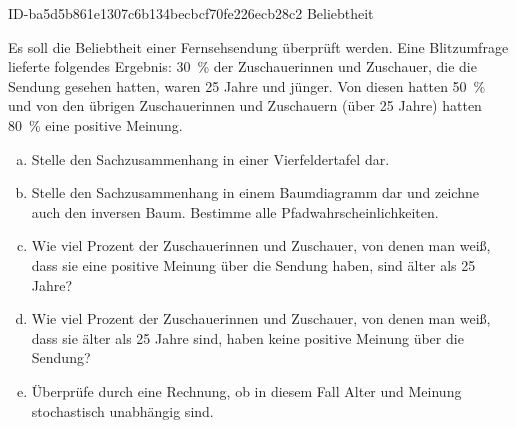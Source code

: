 \begin{exercise}
      {ID-ba5d5b861e1307c6b134becbcf70fe226ecb28c2}
      {Beliebtheit}
  \ifproblem\problem\par
    Es soll die Beliebtheit einer Fernsehsendung
    überprüft werden. Eine Blitzumfrage lieferte
    folgendes Ergebnis: \SI{30}{\percent} der
    Zuschauerinnen und Zuschauer, die die Sendung
    gesehen hatten, waren \num{25} Jahre und
    jünger. Von diesen hatten \SI{50}{\percent}
    und von den übrigen Zuschauerinnen und
    Zuschauern (über \num{25} Jahre) hatten
    \SI{80}{\percent} eine positive Meinung.
    \begin{enumerate}[a)]
      \item Stelle den Sachzusammenhang in einer
            Vierfeldertafel dar.
      \item Stelle den Sachzusammenhang in einem
            Baumdiagramm dar und zeichne auch den
            inversen Baum. Bestimme alle
            Pfadwahrscheinlichkeiten.
      \item Wie viel Prozent der Zuschauerinnen
            und Zuschauer, von denen man weiß,
            dass sie eine positive Meinung über
            die Sendung haben, sind älter als
            \num{25} Jahre?
      \item Wie viel Prozent der Zuschauerinnen
            und Zuschauer, von denen man weiß,
            dass sie älter als \num{25} Jahre sind,
            haben keine positive Meinung über die
            Sendung?
      \item Überprüfe durch eine Rechnung, ob in
            diesem Fall Alter und Meinung stochastisch
            unabhängig sind.
    \end{enumerate}
  \fi
\end{exercise}
